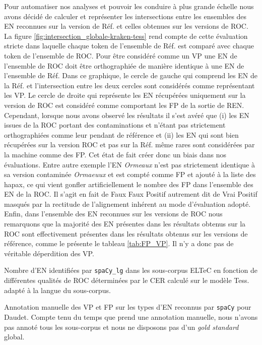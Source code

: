 Pour automatiser nos analyses et pouvoir les conduire à plus grande échelle nous avons décidé de calculer et représenter les intersections entre les ensembles des EN reconnues sur la version de Réf. et celles obtenues sur les versions de ROC. La figure \ref{fig:intersection_globale-kraken-tess} rend compte de cette évaluation stricte dans laquelle chaque token de l'ensemble de Réf. est comparé avec chaque token de l'ensemble de ROC. Pour être considéré comme un VP une EN de l'ensemble de ROC doit être orthographiée de manière identique à une EN de l'ensemble de Réf. Dans ce graphique, le cercle de gauche qui comprend les EN de la Réf. et l'intersection entre les deux cercles sont considérés comme représentant les VP. Le cercle de droite qui représente les EN récupérées uniquement sur la version de ROC est considéré comme comportant les FP de la sortie de REN. Cependant, lorsque nous avons observé les résultats il s'est avéré que (i) les EN issues de la ROC portant des contaminations et n'étant pas strictement orthographiées comme leur pendant de référence et (ii) les EN qui sont bien récupérées sur la version ROC et pas sur la Réf. même rares sont considérées par la machine comme des FP. Cet état de fait créer donc un biais dans nos évaluations. Entre autre exemple l'EN \textit{Ormeaux} n'est pas strictement identique à sa version contaminée \textit{Ormaeuux} et est compté comme FP et ajouté à la liste des hapax, ce qui vient gonfler artificiellement le nombre des FP dans l'ensemble des EN de la ROC. Il s'agit en fait de Faux Faux Positif autrement dit de Vrai Positif masqués par la rectitude de l'alignement inhérent au mode d'évaluation adopté. Enfin, dans l'ensemble des EN reconnues sur les versions de ROC nous remarquons que la majorité des EN présentes dans les résultats obtenus sur la ROC sont effectivement présentes dans les résultats obtenus sur les versions de référence, comme le présente le tableau \ref{tab:FP_VP}. Il n'y a donc pas de véritable déperdition des VP.

\begin{table}[h!]
    \centering
    \small
    
    \caption{Nombre d'EN identifiées par \texttt{spaCy\_lg} dans les sous-corpus ELTeC  en fonction de différentes qualités de ROC déterminées par le CER calculé sur le modèle Tess. adapté à la langue du sous-corpus. 
    }
    \label{tab:ELTeC_bon_mauvais}
\end{table}

\begin{table}[h!]
\small
    \centering
    
    \caption{Annotation manuelle des VP et FP sur les types d'EN reconnus par \texttt{spaCy} pour Daudet. Compte tenu du temps que prend une annotation manuelle, nous n'avons pas annoté tous les sous-corpus et nous ne disposons pas d'un \textit{gold standard} global.}
    \label{tab:FP_VP}
\end{table}



